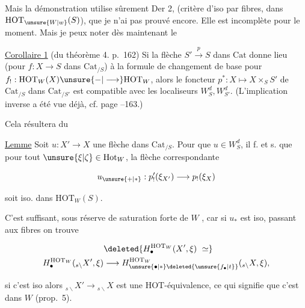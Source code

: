 

Mais la démonstration utilise sûrement Der 2,  (critère d'iso par fibres, dans $\mathrm{HOT}_{\unsure{W|w}}(S)$), que je n'ai pas prouvé encore. Elle est incomplète pour le moment. Mais je peux noter dès maintenant le

\uline{Corollaire 1} (du théorème 4. p.~162) Si la flèche $S'\xrightarrow{p}S$ dans $\mathrm{Cat}$ donne lieu (pour  $f:X\longrightarrow S$  dans $\mathrm{Cat}_{/S}$) à la formule de changement de base pour $f_!:\mathrm{HOT}_W(X)\unsure{\mathord{-}|\longrightarrow}\mathrm{HOT}_W$, alors le foncteur $p^*:X\longmapsto X\times_S S'$ de $\mathrm{Cat}_{/S}$ dans $\mathrm{Cat}_{/S'}$  est compatible avec les localiseurs $W_S^d,W_{S'}^d$. (L'implication inverse a été vue déjà, cf. page --163.)

Cela résultera du

\uline{Lemme} Soit $u:X'\longrightarrow X$ une flèche dans $\mathrm{Cat}_{/S}$. Pour que $u\in W_S^d$, il f. et s.  que pour tout $\unsure{\xi|\zeta}\in\mathrm{Hot}_W$, la flèche correspondante


\[
 u_{\unsure{+|*}}:p'_!(\xi_{X'})\longrightarrow p_!(\xi_X)
\]

soit iso. dans $\mathrm{HOT}_W(S)$.

C'est suffisant, sous réserve de saturation forte de $W$ \deleted{\unsure{$/$}}, car si $u_*$ est iso, passant aux fibres on trouve 

\[
\begin{aligned}
 &\deleted{H_{\bullet}^{\mathrm{HOT}_W}(X',\xi)\ \simeq}\\
 H_{\bullet}^{\mathrm{HOT}_W}({}_{s\backslash}X',\xi)&\longrightarrow
 H_{\unsure{\bullet|*}\deleted{\unsure{f_{\bullet}|t}}}^{\mathrm{HOT}_W}({}_{s\backslash}X,\xi),
\end{aligned}
\]

si c'est iso  alors $ {}_{s\backslash}X'\longrightarrow{}_{s\backslash}X$ est  une $\mathrm{HOT}$-équivalence, ce qui signifie que c'est dans $W$ (prop.~5).


